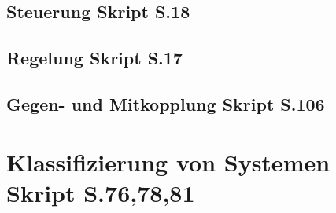 \documentclass[margin=normal]{tex/hsrzf}
\newcommand{\titlewithref}[2]{\texorpdfstring{#1 {\scriptsize \color{RefColor}Skript S.#2}}{#1}}
\begin{document}
\subsection*{\titlewithref{Steuerung}{18}}
\subsection*{\titlewithref{Regelung}{17}}
\subsection*{\titlewithref{Gegen- und Mitkopplung}{106}}





\section{\titlewithref{Klassifizierung von Systemen}{76,78,81}}
\end{document}
